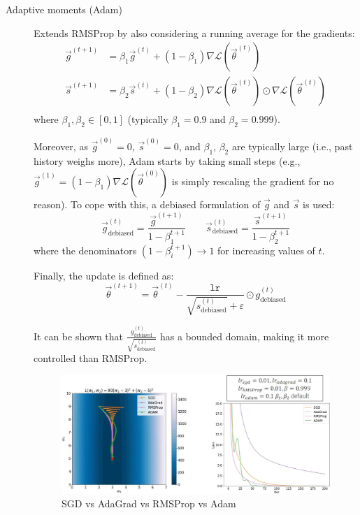 \begin{description}
    \item[Adaptive moments (Adam)] 
        Extends RMSProp by also considering a running average for the gradients:
        \[
            \begin{split}
                \vec{g}^{(t+1)} &= \beta_1 \vec{g}^{(t)} + (1-\beta_1) \nabla\mathcal{L}(\vec{\theta}^{(t)}) \\
                \vec{s}^{(t+1)} &= \beta_2 \vec{s}^{(t)} + (1-\beta_2) \nabla\mathcal{L}(\vec{\theta}^{(t)}) \odot \nabla\mathcal{L}(\vec{\theta}^{(t)}) \\
            \end{split}
        \]
        where $\beta_1, \beta_2 \in [0, 1]$ (typically $\beta_1 = 0.9$ and $\beta_2 = 0.999$).

        Moreover, as $\vec{g}^{(0)} = 0$, $\vec{s}^{(0)} = 0$, and $\beta_1$, $\beta_2$ are typically large (i.e., past history weighs more), Adam starts by taking small steps (e.g., $\vec{g}^{(1)} = (1-\beta_1) \nabla\mathcal{L}(\vec{\theta}^{(0)})$ is simply rescaling the gradient for no reason). To cope with this, a debiased formulation of $\vec{g}$ and $\vec{s}$ is used:
        \[
            \vec{g}^{(t)}_{\text{debiased}} = \frac{\vec{g}^{(t+1)}}{1-\beta_1^{t+1}} 
            \qquad
            \vec{s}^{(t)}_{\text{debiased}} = \frac{\vec{s}^{(t+1)}}{1-\beta_2^{t+1}} 
        \]
        where the denominators $(1-\beta_i^{t+1}) \rightarrow 1$ for increasing values of $t$.

        Finally, the update is defined as:
        \[
            \vec{\theta}^{(t+1)} = \vec{\theta}^{(t)} - \frac{\texttt{lr}}{\sqrt{s^{(t)}_{\text{debiased}}} + \varepsilon} \odot g^{(t)}_{\text{debiased}}
        \]

        \begin{remark}
            It can be shown that $\frac{g^{(t)}_{\text{debiased}}}{\sqrt{s^{(t)}_{\text{debiased}}}}$ has a bounded domain, making it more controlled than RMSProp.
        \end{remark}

        \begin{figure}[H]
            \centering
            \includegraphics[width=0.75\linewidth]{./img/adam.jpg}
            \caption{SGD vs AdaGrad vs RMSProp vs Adam}
        \end{figure}


\end{description}
